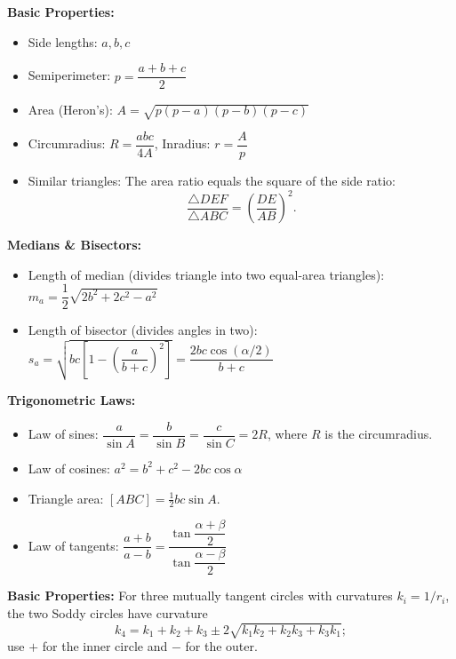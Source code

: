 \noindent
\textbf{Basic Properties:}
\begin{itemize}[leftmargin=*, nosep]
    \item Side lengths: $a, b, c$
    \item Semiperimeter: $p = \dfrac{a+b+c}{2}$
    \item Area (Heron's): $A = \sqrt{p(p-a)(p-b)(p-c)}$
    \item Circumradius: $R = \dfrac{abc}{4A}$, \quad Inradius: $r = \dfrac{A}{p}$
    \item Similar triangles: The area ratio equals the square of the side ratio:
\[ \frac{\triangle DEF}{\triangle ABC}=\left(\frac{DE}{AB}\right)^2. \]

\end{itemize}

\vspace{1pt}
\noindent
\textbf{Medians \& Bisectors:}
\begin{itemize}[leftmargin=*, nosep]
    \item Length of median (divides triangle into two equal-area triangles): \\
          $m_a = \dfrac{1}{2}\sqrt{2b^2 + 2c^2 - a^2}$
    \item Length of bisector (divides angles in two): \\
          $s_a = \sqrt{bc\left[1 - \left(\dfrac{a}{b+c}\right)^2\right]} = \dfrac{2bc\cos(\alpha/2)}{b+c}$
\end{itemize}

\vspace{1pt}
\noindent
\textbf{Trigonometric Laws:}
\begin{itemize}[leftmargin=*, nosep]
    \item Law of sines: $\dfrac{a}{\sin A}=\dfrac{b}{\sin B}=\dfrac{c}{\sin C}=2R$, where $R$ is the circumradius.
    \item Law of cosines: $a^2 = b^2 + c^2 - 2bc\cos\alpha$
    \item Triangle area: $[ABC]=\tfrac{1}{2} bc\sin A$.
    \item Law of tangents: $\dfrac{a+b}{a-b} = \dfrac{\tan\dfrac{\alpha+\beta}{2}}{\tan\dfrac{\alpha-\beta}{2}}$
\end{itemize}

\noindent
\textbf{Basic Properties:}
 For three mutually tangent circles with curvatures $k_i=1/r_i$, the two Soddy circles have curvature
\[ k_4=k_1+k_2+k_3\pm2\sqrt{k_1k_2+k_2k_3+k_3k_1}; \]
use $+$ for the inner circle and $-$ for the outer.

